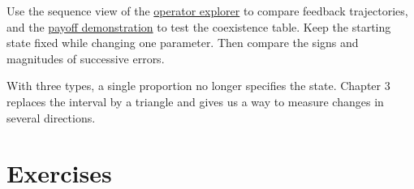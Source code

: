 \documentclass[11pt,oneside,openany]{book}
\theoremstyle{definition}
\theoremstyle{remark}
\numberwithin{equation}{chapter}
\begin{document}
Use the sequence view of the \href{https://bobovski66.github.io/IntroDiscreteInfoGeom/demos/operator-explorer.html}{operator explorer} to compare feedback trajectories, and the \href{https://bobovski66.github.io/IntroDiscreteInfoGeom/demos/week02.html}{payoff demonstration} to test the coexistence table. Keep the starting state fixed while changing one parameter. Then compare the signs and magnitudes of successive errors.

With three types, a single proportion no longer specifies the state. Chapter 3 replaces the interval by a triangle and gives us a way to measure changes in several directions.

\section{Exercises}\label{ch02-exercises}
\end{document}
